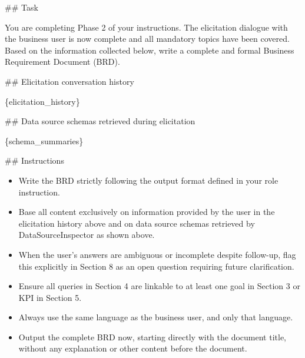 \#\# Task
\newline

You are completing Phase 2 of your instructions. The elicitation dialogue with the business user is now complete and all mandatory topics have been covered. Based on the information collected below, write a complete and formal Business Requirement Document (BRD).
\newline

\#\# Elicitation conversation history
\newline

\{elicitation\_history\}
\newline

\#\# Data source schemas retrieved during elicitation
\newline

\{schema\_summaries\}
\newline

\#\# Instructions
\begin{itemize}
    \item Write the BRD strictly following the output format defined in your role instruction.
    \item Base all content exclusively on information provided by the user in the elicitation history above and on data source schemas retrieved by DataSourceInspector as shown above.
    \item When the user's answers are ambiguous or incomplete despite follow-up, flag this explicitly in Section 8 as an open question requiring future clarification.
    \item Ensure all queries in Section 4 are linkable to at least one goal in Section 3 or KPI in Section 5.
    \item Always use the same language as the business user, and only that language.
    \item Output the complete BRD now, starting directly with the document title, without any explanation or other content before the document.
\end{itemize}
